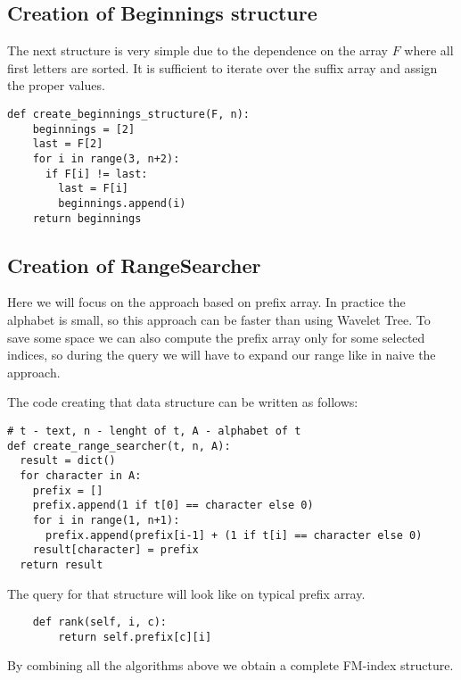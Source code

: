\subsection{Creation of Beginnings structure}
The next structure is very simple due to the dependence on the array $F$ where all first letters are sorted. It is sufficient to iterate over the suffix array and assign the proper values.

\begin{verbatim}
def create_beginnings_structure(F, n):
    beginnings = [2]
    last = F[2]
    for i in range(3, n+2):
      if F[i] != last:
        last = F[i]
        beginnings.append(i)
    return beginnings
\end{verbatim}
\subsection{Creation of RangeSearcher}

Here we will focus on the approach based on prefix array. In practice the alphabet is small, so this approach can be faster than using Wavelet Tree. To save some space we can also compute the prefix array only for some selected indices, so during the query we will have to expand our range like in naive the approach. 
\newline
\newline

The code creating that data structure can be written as follows:
\begin{verbatim}
# t - text, n - lenght of t, A - alphabet of t
def create_range_searcher(t, n, A):
  result = dict()
  for character in A:
    prefix = []
    prefix.append(1 if t[0] == character else 0)
    for i in range(1, n+1):
      prefix.append(prefix[i-1] + (1 if t[i] == character else 0)
    result[character] = prefix
  return result     
\end{verbatim}

The query for that structure will look like on typical prefix array.

\begin{verbatim}
    def rank(self, i, c):
        return self.prefix[c][i]
\end{verbatim}


By combining all the algorithms above we obtain a complete FM-index structure.
